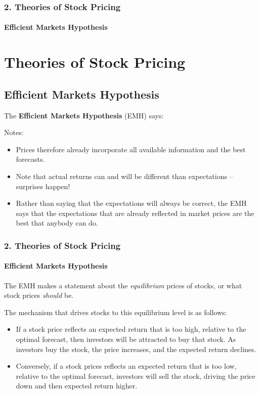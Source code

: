 \documentclass{beamer}
\begin{document}
\begin{frame}[t]
    \frametitle{2. Theories of Stock Pricing}
    \framesubtitle{Efficient Markets Hypothesis}
    \section{Theories of Stock Pricing}
    \subsection{Efficient Markets Hypothesis}

    The \textbf{Efficient Markets Hypothesis} (EMH) says:


    \vspace{-2em}
    Notes:
    \begin{itemize}
        \item Prices therefore already incorporate all available information and the best forecasts.
        \item Note that actual returns can and will be different than expectations – surprises happen!
        \item Rather than saying that the expectations will always be correct, the EMH says that the expectations that are already reflected in market prices are the best that anybody can do.
    \end{itemize}

\end{frame}

\begin{frame}[t]
    \frametitle{2. Theories of Stock Pricing}
    \framesubtitle{Efficient Markets Hypothesis}

    The EMH makes a statement about the \textit{equilibrium} prices of stocks, or what stock prices \textit{should} be.   
    \vspace{1em}
    
    The mechanism that drives stocks to this equilibrium level is as follows:
    \begin{itemize}
        \item If a stock price reflects an expected return that is too high, relative to the optimal forecast, then investors will be attracted to buy that stock.   As investors buy the stock, the price increases, and the expected return declines.
        \item Conversely, if a stock prices reflects an expected return that is too low, relative to the optimal forecast, investors will sell the stock, driving the price down and then expected return higher.
    \end{itemize}
    
\end{frame}
\end{document}
